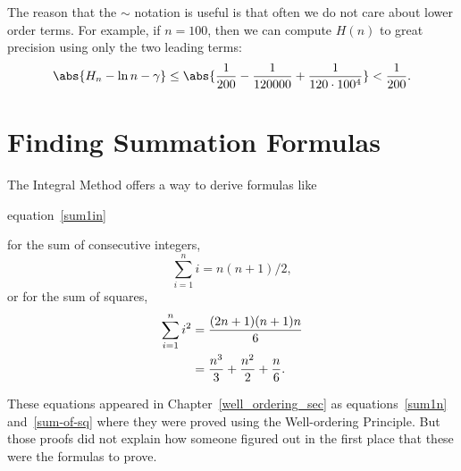 The reason that the $\sim$ notation is useful is that often we do not care
about lower order terms.  For example, if $n = 100$, then we can compute
$H(n)$ to great precision using only the two leading terms:
\[
\abs{H_n - \ln n - \gamma} \leq \abs{\frac{1}{200} - \frac{1}{120000} +
\frac{1}{120 \cdot 100^4}} < \frac{1}{200}.
\]
\begin{problems}
\classproblems
{}

\homeworkproblems
{}

\end{problems}

\section{Finding Summation Formulas}\label{findsum_sec}

The Integral Method offers a way to derive formulas like
\begin{editingnotes}equation~\eqref{sum1in}\end{editingnotes}
for the sum of consecutive integers,
\[
\sum_{i=1}^n i = n(n+1)/2,
\]
or for the sum of squares,
\begin{align}
\sum_{i=1}^n i^2 & =  \frac{(2n+1)(n+1)n}{6}\notag \\
                & =  \frac{n^3}{3} + \frac{n^2}{2} + \frac{n}{6}.\label{sumsqcubic}
\end{align}

These equations appeared in Chapter~\ref{well_ordering_sec} as
equations~\eqref{sum1n} and~\eqref{sum-of-sq} where they were proved using
the Well-ordering Principle.  But those proofs did not explain how someone
figured out in the first place that these were the formulas to prove.

